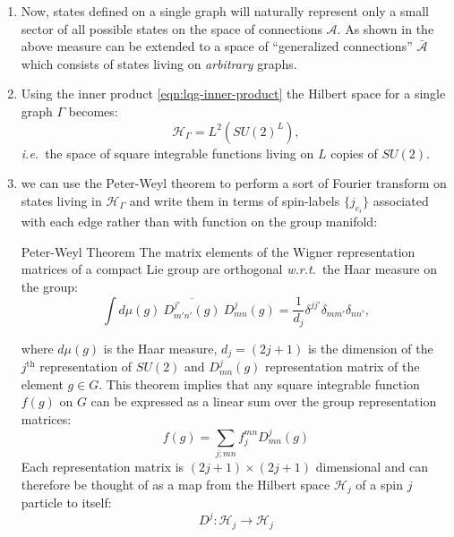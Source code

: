 \documentclass[preprint]{SciPost}
\newcommand{\ie}{\textit{i.e.}~}
\newcommand{\wrt}{\textit{w.r.t.}~}
\newcommand{\mc}[1]{\mathcal{#1}}
\theoremstyle{plain} %
\newcommand{\thistheoremname}{}
\newtheorem*{genericthm*}{\thistheoremname}
\newenvironment{namedthm*}[1]
{\renewcommand{\thistheoremname}{#1}%
	\begin{genericthm*}}
	{\end{genericthm*}}
\begin{document}
\begin{enumerate}[label=\arabic*.]
\begin{equation}
		\end{equation}
		\item Now, states defined on a single graph will naturally represent only a small sector of all possible states on the space of connections $ \mc{A} $. As shown in \cite{Ashtekar1994A-Manifestly} the above measure can be extended to a space of ``generalized connections'' $ \bar{\mc{A}} $ which consists of states living on \emph{arbitrary} graphs.
		\item Using the inner product \eqref{eqn:lqg-inner-product} the Hilbert space for a single graph $ \Gamma $ becomes:
		\begin{equation}\label{eqn:graph-hilbert-space-v1}
		\mc{H}_\Gamma = L^2(SU(2)^L),
		\end{equation}
		\ie the space of square integrable functions living on $ L $ copies of $ SU(2) $.
		\item we can use the Peter-Weyl theorem to perform a sort of Fourier transform on states living in $ \mc{H}_\Gamma $ and write them in terms of spin-labels $ \{j_{e_i}\} $ associated with each edge rather than with function on the group manifold:
		\begin{namedthm*}{Peter-Weyl Theorem}
			The matrix elements of the Wigner representation matrices of a compact Lie group are orthogonal \wrt the Haar measure on the group:
			\begin{equation}\label{eqn:peter-weyl}
			\int d\mu(g) ~\overline{D^{j'}_{m'n'}(g)}~D^j_{mn}(g)  = \frac{1}{d_j} \delta^{jj'} \delta_{mm'} \delta_{nn'},
			\end{equation}
		\end{namedthm*}
		where $ d\mu(g) $ is the Haar measure, $ d_j = (2j + 1) $ is the dimension of the $ j^{\text{th}} $ representation of $ SU(2) $ and $ D^j_{mn}(g) $ representation matrix of the element $ g \in G $. This theorem implies that any square integrable function $ f(g) $ on $ G $ can be expressed as a linear sum over the group representation matrices:
		\begin{equation}\label{eqn:group-fourier}
		f(g) = \sum_{j;mn} f^{mn}_j D^j_{mn}(g)
		\end{equation}
		Each representation matrix is $ (2j+1) \times (2j+1) $ dimensional and can therefore be thought of \cite[Sec 5.2]{Rovelli2014Covariant} as a map from the Hilbert space $ \mc{H}_j $ of a spin $ j $ particle to itself:
		\begin{equation}\label{eqn:su2-map}
		D^j : \mc{H}_j \rightarrow \mc{H}_j
		\end{equation}

\end{enumerate}
\end{document}
